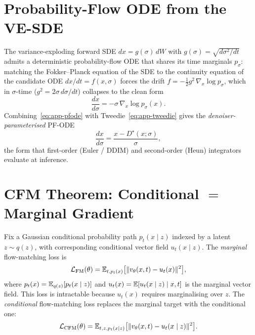 \section{Probability-Flow ODE from the VE-SDE}
\label{app:pfode}

The variance-exploding forward SDE $dx = g(\sigma)\,dW$ with $g(\sigma) = \sqrt{d\sigma^2/dt}$ admits a deterministic probability-flow ODE that shares its time marginals $p_\sigma$: matching the Fokker--Planck equation of the SDE to the continuity equation of the candidate ODE $dx/dt = f(x,\sigma)$ \citep{song2021scoresde} forces the drift $f = -\tfrac{1}{2}g^2\,\nabla_x\log p_\sigma$, which in $\sigma$-time ($g^2 = 2\sigma\,d\sigma/dt$) collapses to the clean form
\begin{equation}
  \boxed{\;\frac{dx}{d\sigma} = -\sigma\,\nabla_x \log p_\sigma(x).\;}
  \label{eq:app-pfode}
\end{equation}
Combining~\eqref{eq:app-pfode} with Tweedie~\eqref{eq:app-tweedie} gives the \emph{denoiser-parameterised} PF-ODE
\begin{equation}
  \frac{dx}{d\sigma} = \frac{x - D^\star(x; \sigma)}{\sigma},
  \label{eq:app-pfode-denoiser}
\end{equation}
the form that first-order (Euler / DDIM) and second-order (Heun) integrators evaluate at inference.

\section{CFM Theorem: Conditional $=$ Marginal Gradient}
\label{app:cfm-theorem}

Fix a Gaussian conditional probability path $p_t(x \mid z)$ indexed by a latent $z \sim q(z)$, with corresponding conditional vector field $u_t(x \mid z)$. The \emph{marginal} flow-matching loss is
\begin{equation*}
  \mathcal{L}_{\text{FM}}(\theta) = \mathbb{E}_{t, p_t(x)}\bigl[\|v_\theta(x, t) - u_t(x)\|^2\bigr],
\end{equation*}
where $p_t(x) = \mathbb{E}_{q(z)}[p_t(x \mid z)]$ and $u_t(x) = \mathbb{E}[u_t(x\mid z) \mid x, t]$ is the marginal vector field. This loss is intractable because $u_t(x)$ requires marginalising over $z$. The \emph{conditional} flow-matching loss replaces the marginal target with the conditional one:
\begin{equation*}
  \mathcal{L}_{\text{CFM}}(\theta) = \mathbb{E}_{t, z, p_t(x \mid z)}\bigl[\|v_\theta(x, t) - u_t(x \mid z)\|^2\bigr].
\end{equation*}

